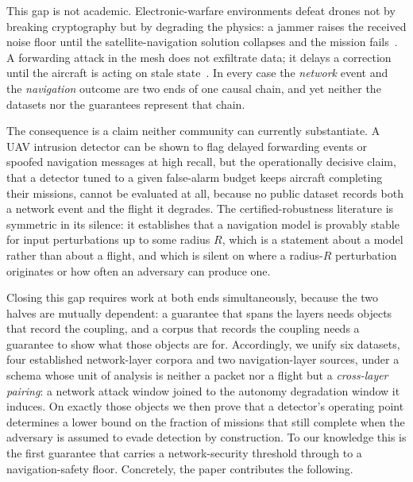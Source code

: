 This gap is not academic. Electronic-warfare environments defeat drones not by
breaking cryptography but by degrading the physics: a jammer raises the received
noise floor until the satellite-navigation solution collapses and the mission
fails~\cite{kassas2022jammer}. A forwarding attack in the mesh does not
exfiltrate data; it delays a correction until the aircraft is acting on stale
state~\cite{datamut2026,lou2019timedelay}. In every case the \emph{network}
event and the \emph{navigation} outcome are two ends of one causal chain, and
yet neither the datasets nor the guarantees represent that chain.

The consequence is a claim neither community can currently substantiate. A UAV
intrusion detector can be shown to flag delayed forwarding events or spoofed
navigation messages at high recall, but the operationally decisive
claim, that a detector tuned to a given false-alarm budget keeps aircraft
completing their missions, cannot be evaluated at all, because no public dataset
records both a network event and the flight it degrades. The certified-robustness
literature is symmetric in its silence: it establishes that a navigation model is
provably stable for input perturbations up to some radius $R$, which is a
statement about a model rather than about a flight, and which is silent on where
a radius-$R$ perturbation originates or how often an adversary can produce one.

Closing this gap requires work at both ends simultaneously, because the two
halves are mutually dependent: a guarantee that spans the layers needs objects
that record the coupling, and a corpus that records the coupling needs a
guarantee to show what those objects are for. Accordingly, we unify six
datasets, four established network-layer corpora and two navigation-layer
sources, under a schema whose unit of analysis is neither a packet nor a flight
but a \emph{cross-layer pairing}: a network attack window joined to the autonomy
degradation window it induces. On exactly those objects we then prove that a
detector's operating point determines a lower bound on the fraction of missions
that still complete when the adversary is assumed to evade detection by
construction. To our knowledge this is the first guarantee that carries a
network-security threshold through to a navigation-safety floor. Concretely, the
paper contributes the following.

